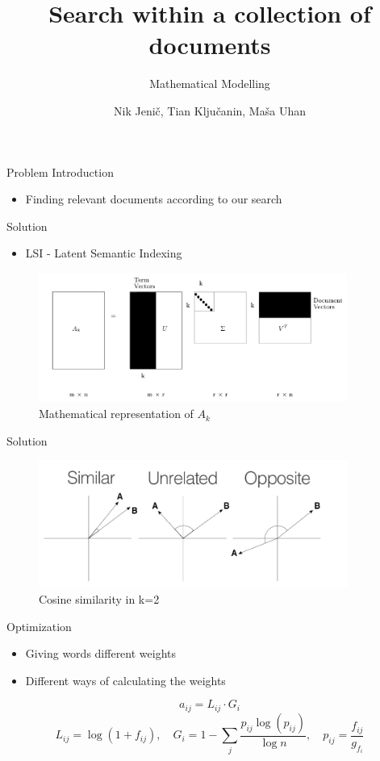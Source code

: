 \documentclass{beamer}
\title{Search within a collection of documents}
\subtitle{Mathematical Modelling}
\author{Nik Jenič, Tian Ključanin, Maša Uhan}
\date{}
\begin{document}
\frame{\titlepage}

\begin{frame}{Problem Introduction}
    \begin{itemize}
        \item Finding relevant documents according to our search
    \end{itemize}
\end{frame}

\begin{frame}{Solution}
    \begin{itemize}
        \item LSI - Latent Semantic Indexing
    \end{itemize}
    \begin{figure}
        \centering
        \includegraphics[width=0.9\textwidth]{../Slike/svd.png}
        \caption{Mathematical representation of $A_k$}
        \label{fig:matrixA}
      \end{figure}
\end{frame}

\begin{frame}{Solution}
    \begin{figure}
        \centering
        \includegraphics[width=0.9\textwidth]{../Slike/cosine.png}
        \caption{Cosine similarity in k=2}
        \label{fig:matrixA}
    \end{figure}
\end{frame}

\begin{frame}{Optimization}
    \begin{itemize}
        \item Giving words different weights
        \item Different ways of calculating the weights
    \end{itemize}
    \begin{center}
        \[
            a_{ij} = L_{ij} \cdot G_i
        \]
        \[
            L_{ij} = \log (1 + f_{ij}), \quad G_i = 1 - \sum_{j} \frac{p_{ij} \log (p_{ij})}{\log n}, \quad p_{ij} = \frac{f_{ij}}{g_{f_i}}
        \]
    \end{center}
\end{frame}
\end{document}
